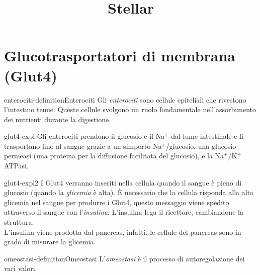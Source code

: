 \documentclass[preview]{standalone}
\begin{document}
\title{Stellar}
\genpage

\section{Glucotrasportatori di membrana (Glut4)}

\begin{snippetdefinition}{enterociti-definition}{Enterociti}
    Gli \textit{enterociti} sono cellule epiteliali che rivestono l'intestino tenue.
    Queste cellule svolgono un ruolo fondamentale nell'assorbimento dei nutrienti durante la digestione.
\end{snippetdefinition}

\begin{snippet}{glut4-expl}
    Gli enterociti prendono il glucosio e il Na\({}^+\) dal lume intestinale
    e li trasportano fino al sangue grazie a un simporto Na\({}^+\)/glucosio, una glucosio permeasi
    (una proteina per la diffusione facilitata del glucosio), e la Na\({}^+\)/K\({}^+\)ATPasi. 
\end{snippet}



\begin{snippet}{glut4-expl2}
    I Glut4 verranno inseriti nella cellula quando il sangue è pieno di glucosio (quando la \textit{glicemia} è alta).
È necessario che la cellula risponda alla alta glicemia nel sangue per produrre i Glut4,
questo messaggio viene spedito attraverso il sangue con l'\textit{insulina}.
L'insulina lega il ricettore, cambiandone la struttura. \\
L'insulina viene prodotta dal pancreas, infatti, le cellule del pancreas sono in grado di misurare la glicemia.
\end{snippet}



\begin{snippetdefinition}{omeostasi-definition}{Omeostasi}
    L'\textit{omeostasi} è il processo di autoregolazione dei vari valori.
\end{snippetdefinition}


\end{document}
